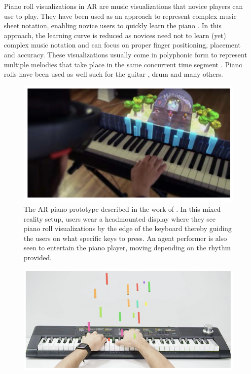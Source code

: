 \documentclass[manuscript,screen]{acmart}
\begin{document}
Piano roll visualizations in AR are music visualizations that novice players can use to play. They have been used as an approach to represent complex music sheet notation, enabling novice users to quickly learn the piano \cite{walder2016modelling}. In this approach, the learning curve is reduced as novices need not to learn (yet) complex music notation and can focus on proper finger positioning, placement and accuracy. These visualizations usually come in polyphonic form to represent multiple melodies that take place in the same concurrent time segment \cite{ciuha2010visualization}.  Piano rolls have been used as well such for the guitar \cite{biamonte2010musical}, drum \cite{rossignol2015alternate} and many others. 

\begin{figure}
    \centering
    \includegraphics[width=15cm]{figures/daspiano.png}
    \caption{The AR piano prototype described in the work of \citet{das2017music}. In this mixed reality setup, users wear a headmounted display where they see piano roll visualizations by the edge of the keyboard thereby guiding the users on what specific keys to press. An agent performer is also seen to entertain the piano player, moving depending on the rhythm provided. }
    \label{fig:daspiano}
\end{figure}

\begin{figure}
    \centering
    \includegraphics[width=15cm]{figures/arpianotrujano.png}
    \caption{\cite{trujano2018arpiano} }
    \label{fig:View from the HeadMounted}
\end{figure}
\end{document}
